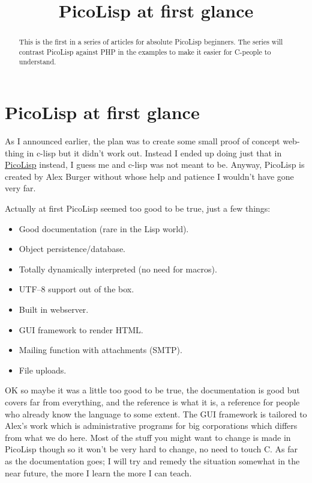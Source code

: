 \title{PicoLisp at first glance}

\maketitle


\begin{abstract}

  This is the first in a series of articles for absolute PicoLisp
  beginners. The series will contrast PicoLisp against PHP in the
  examples to make it easier for C-people to understand.
  
\end{abstract}

\section{PicoLisp at first glance}
\label{sec:first-glance}

As I announced earlier, the plan was to create some small proof of
concept web-thing in c-lisp but it didn't work out. Instead I ended up
doing just that in \href{http://www.software-lab.de/down.html}{PicoLisp}
instead, I guess me and c-lisp was not meant to be. Anyway, PicoLisp is
created by Alex Burger without whose help and patience I wouldn't have
gone very far.

Actually at first PicoLisp seemed too good to be true, just a few things:
\begin{itemize}
\item Good documentation (rare in the Lisp world).
\item Object persistence/database.
\item Totally dynamically interpreted (no need for macros).
\item UTF--8 support out of the box.
\item Built in webserver.
\item GUI framework to render HTML.
\item Mailing function with attachments (SMTP).
\item File uploads.
\end{itemize}

OK so maybe it was a little too good to be true, the documentation is
good but covers far from everything, and the reference is what it is, a
reference for people who already know the language to some extent. The
GUI framework is tailored to Alex's work which is administrative
programs for big corporations which differs from what we do here. Most
of the stuff you might want to change is made in PicoLisp though so it won't
be very hard to change, no need to touch C. As far as the documentation
goes; I will try and remedy the situation somewhat in the near future,
the more I learn the more I can teach.


